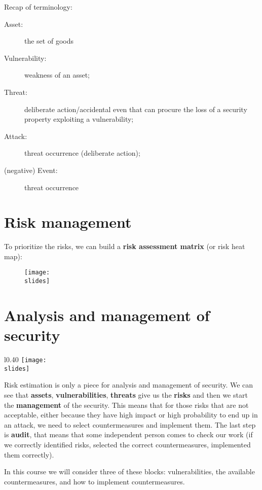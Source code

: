 \bigskip
Recap of terminology:
\begin{description}
  \item[Asset:] the set of goods
  \item[Vulnerability:] weakness of an asset;
  \item[Threat:] deliberate action/accidental even that can procure the loss of a security property exploiting a vulnerability;
  \item[Attack:] threat occurrence (deliberate action);
  \item[(negative) Event:] threat occurrence
\end{description}


\section{Risk management}
To prioritize the risks, we can build a \textbf{risk assessment matrix} (or risk heat map):
\begin{figure}[h]
  \texttt{[image: \\slides]}
\end{figure}


\section{Analysis and management of security}

\begin{wrapfigure}{l}{0.40\textwidth}
  \centering
  \texttt{[image: \\slides]}
\end{wrapfigure}
Risk estimation is only a piece for analysis and management of security. We can see that \textbf{assets}, \textbf{vulnerabilities}, \textbf{threats} give us the \textbf{risks} and then we start the \textbf{management} of the security. This means that for those risks that are not acceptable, either because they have high impact or high probability to end up in an attack, we need to select countermeasures and implement them. The last step is \textbf{audit}, that means that some independent person comes to check our work (if we correctly identified risks, selected the correct countermeasures, implemented them correctly).

In this course we will consider three of these blocks: vulnerabilities, the available countermeasures, and how to implement countermeasures.


